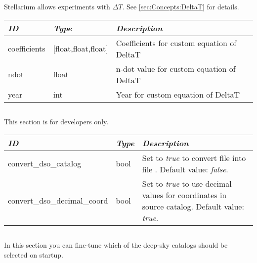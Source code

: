 
\subsection{}
\label{sec:config.ini:custom_time_correction}

Stellarium allows experiments with $\Delta T$. See \ref{sec:Concepts:DeltaT} for details.

\begin{longtabu} to \textwidth {l|l|X}\toprule
\emph{ID}    & \emph{Type} & \emph{Description}\\\midrule
coefficients & [float,float,float] & Coefficients for custom equation of DeltaT\\\midrule
ndot & float & n-dot value for custom equation of DeltaT\\\midrule
year & int   & Year for custom equation of DeltaT\\\bottomrule
\end{longtabu}

\subsection{}
\label{sec:config.ini:devel}

This section is for developers only. 

\begin{longtabu} to \textwidth {l|l|X}\toprule
\emph{ID}              & \emph{Type} & \emph{Description}\\\midrule
convert\_dso\_catalog        & bool & Set to \emph{true} to convert file  
                                      into file . Default value: \emph{false}.\\\midrule
convert\_dso\_decimal\_coord & bool & Set to \emph{true} to use decimal values for coordinates 
                                      in source catalog. Default value: \emph{true}.\\\bottomrule
\end{longtabu}

\subsection{}
\label{sec:config.ini:dso_catalog_filters}
In this section you can fine-tune which of the deep-sky catalogs should be selected on startup.

